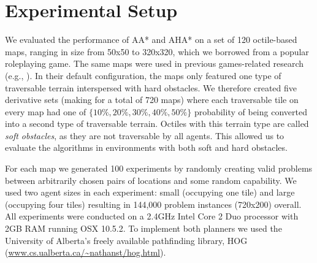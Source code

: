 \section{Experimental Setup}
We evaluated the performance of AA* and AHA* on a set of 120 octile-based maps, ranging in size from 50x50 to 320x320, which we borrowed from a popular roleplaying game.
The same maps were used in previous games-related research (e.g., \cite{botea04}).
In their default configuration, the maps only featured one type of traversable terrain interspersed with hard obstacles. 
We therefore created five derivative sets (making for a total of 720 maps) where each traversable tile on every map had one of $\lbrace 10\%, 20\%, 30\%, 40\%, 50\% \rbrace$ probability of being converted into a second type of traversable terrain. Octiles with this terrain type are called \emph{soft obstacles}, as they are not traversable by all agents.
This allowed us to evaluate the algorithms in environments with both soft and hard obstacles.
\par \indent
For each map we generated 100 experiments by randomly creating valid problems between arbitrarily chosen pairs of locations and some random capability.
We used two agent sizes in each experiment: small (occupying one tile) and large (occupying four tiles) resulting in 144,000 problem instances (720x200) overall.
All experiments were conducted on a 2.4GHz Intel Core 2 Duo processor with 2GB RAM running OSX 10.5.2.
To implement both planners we used the University of Alberta's freely available pathfinding library, HOG (\url{www.cs.ualberta.ca/~nathanst/hog.html}). 
